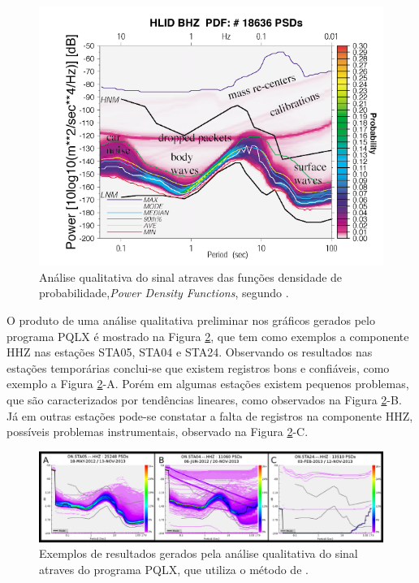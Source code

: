 \begin{figure}[!ht]
\centering
\includegraphics[scale=0.6]{Figs/mcnamura_buland.png}
\caption[Análise qualitativa do sinal atraves das funções densidade de probabilidade]{Análise qualitativa do sinal atraves das funções densidade de probabilidade,\textit{Power Density Functions}, segundo \cite{McNamara_Buland_2004}.}
\label{PQLX}
\end{figure}

O produto de uma análise qualitativa preliminar nos gráficos gerados pelo programa PQLX é mostrado na Figura \ref{PQLX_results}, que tem como exemplos a componente HHZ nas estações STA05, STA04 e STA24. Observando os resultados nas estações temporárias conclui-se que existem registros bons e confiáveis, como exemplo a Figura \ref{PQLX_results}-A. Porém em algumas estações existem pequenos problemas, que são caracterizados por tendências lineares, como observados na Figura \ref{PQLX_results}-B. Já em outras estações pode-se constatar a falta de registros na componente HHZ,   possíveis problemas instrumentais, observado na Figura \ref{PQLX_results}-C.

\begin{figure}[!ht]
\centering
\includegraphics[scale=0.3]{Figs/pqlx_results.png}
\caption{Exemplos de resultados gerados pela análise qualitativa do sinal atraves do programa PQLX, que utiliza o método de \cite{McNamara_Buland_2004}.}
\label{PQLX_results}
\end{figure}

